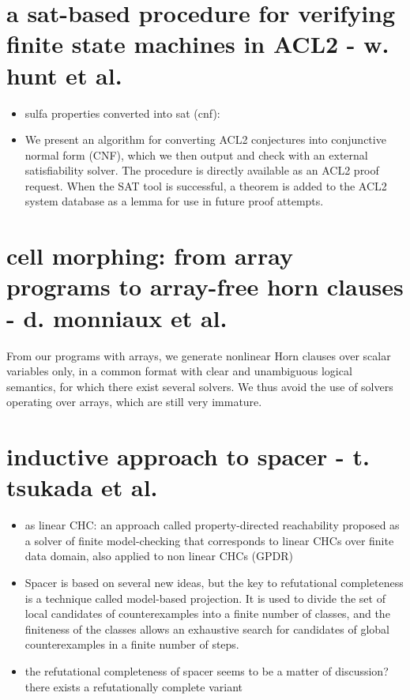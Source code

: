 \documentclass[]{article}
\begin{document}
\section{a sat-based procedure for verifying finite state machines in ACL2 - w. hunt et al.}
\begin{itemize}
    \item sulfa properties converted into sat (cnf): 
    \item We present an algorithm for converting ACL2 conjectures into conjunctive normal form (CNF),
        which we then output and check with an external satisfiability solver. 
        The procedure is directly available as an ACL2 proof request. 
        When the SAT tool is successful, a theorem  is added to the ACL2 system database as a lemma for use
        in future proof attempts. 
\end{itemize}

\section{cell morphing: from array programs to array-free horn clauses - d. monniaux et al.}

From our programs with arrays, we generate nonlinear Horn clauses over scalar variables only,
    in a common format with clear and unambiguous logical semantics, for which there exist several
    solvers. We thus avoid the use of solvers operating over arrays, which are still very immature.

\section{inductive approach to spacer - t. tsukada et al.}

\begin{itemize}
    \item as linear CHC: an approach called property-directed reachability proposed as a solver of finite model-checking 
    that corresponds to linear CHCs over finite data domain, also applied to non linear CHCs (GPDR)
    \item Spacer is based on several new ideas, but the key to refutational completeness is a technique 
    called model-based projection. It is used to divide the set of local candidates
    of counterexamples into a finite number of classes, and the finiteness of the classes allows an
    exhaustive search for candidates of global counterexamples in a finite number of steps.
    \item the refutational completeness of spacer seems to be a matter of discussion? there exists a refutationally
    complete variant
\end{itemize}
\end{document}
